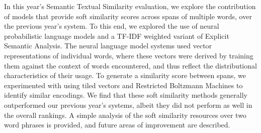 In this year's Semantic Textual Similarity evaluation, we explore the contribution of models that provide soft similarity scores across spans of
 multiple words, over the previous year's system. To this end, we explored the
 use of neural probabilistic language models and a TF-IDF weighted variant of
 Explicit Semantic Analysis. The neural language model systems used vector
 representations of individual words, where these vectors were derived by
 training them against the context of words encountered, and thus reflect the
 distributional characteristics of their usage. To generate a similarity score
 between spans, we experimented with using tiled vectors and Restricted
 Boltzmann Machines to identify similar encodings. We find that these soft
 similarity methods generally outperformed our previous year's systems, albeit
 they did not perform as well in the overall rankings. A simple analysis of the
 soft similarity resources over two word phrases is provided, and future areas
 of improvement are described.

